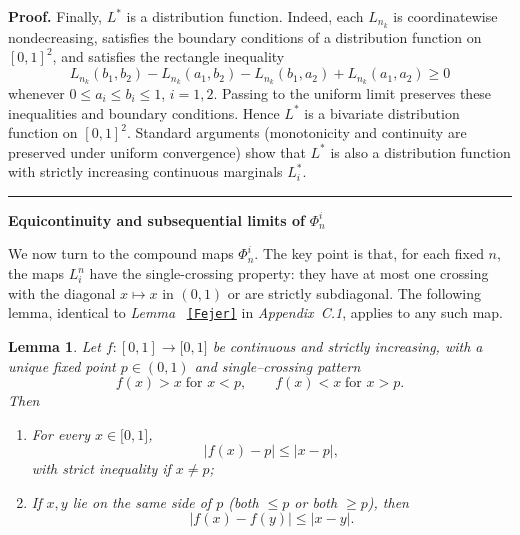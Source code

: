 \documentclass[onecolumn]{article}
\newtheorem{lemma}[theorem]{Lemma}
\newenvironment{proof}[1][Proof]{\noindent\textbf{#1.} }{\ \rule{0.5em}{0.5em}}
\begin{document}
\begin{proof}
\noindent Finally, $L^{\ast }$ is a distribution function. Indeed, each $%
L_{n_{k}}$ is coordinatewise nondecreasing, satisfies the boundary
conditions of a distribution function on $[0,1]^{2}$, and satisfies the
rectangle inequality 
\begin{equation}
L_{n_{k}}(b_{1},b_{2})-L_{n_{k}}(a_{1},b_{2})-L_{n_{k}}(b_{1},a_{2})+L_{n_{k}}(a_{1},a_{2})\geq 0
\label{5014}
\end{equation}%
whenever $0\leq a_{i}\leq b_{i}\leq 1$, $i=1,2$. Passing to the uniform
limit preserves these inequalities and boundary conditions. Hence $L^{\ast }$
is a bivariate distribution function on $[0,1]^{2}$. Standard arguments
(monotonicity and continuity are preserved under uniform convergence) show
that $L^{\ast }$ is also a distribution function with strictly increasing
continuous marginals $L_{i}^{\ast }.$\hfill
\end{proof}

\begin{flushleft}
\textbf{Equicontinuity and subsequential limits of }$\Phi _{n}^{i}$
\end{flushleft}

We now turn to the compound maps $\Phi _{n}^{i}$. The key point is that, for
each fixed $n$, the maps $L_{i}^{n}$ have the single-crossing property: they
have at most one crossing with the diagonal $x\mapsto x$ in $(0,1)$ or are
strictly subdiagonal. The following lemma, identical to \textit{Lemma}~%
\texttt{\textup{\ref{Fejer}}} in \textit{Appendix~C.1}, applies to any such
map.

\begin{lemma}
\label{FejerNew} Let $f:[0,1]\rightarrow \lbrack 0,1]$ be continuous and
strictly increasing, with a unique fixed point $p\in (0,1)$ and
single--crossing pattern 
\begin{equation}
f(x)>x\;\text{for }x<p,\qquad f(x)<x\;\text{for }x>p.  \label{915}
\end{equation}%
Then

\begin{enumerate}
\item[(i)] For every $x\in \lbrack 0,1]$, 
\begin{equation}
|f(x)-p|\leq |x-p|,  \label{916}
\end{equation}%
with strict inequality if $x\neq p$;

\item[(ii)] If $x,y$ lie on the same side of $p$ (both $\leq p$ or both $%
\geq p$), then 
\begin{equation}
|f(x)-f(y)|\leq |x-y|.  \label{917}
\end{equation}
\end{enumerate}
\end{lemma}
\end{document}
